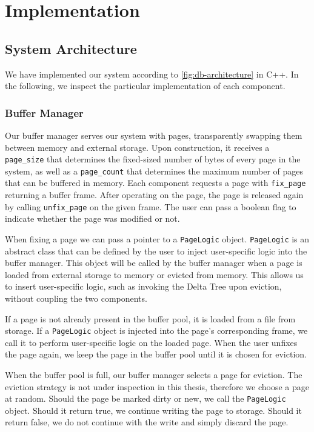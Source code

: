 \chapter{Implementation}
\label{chap:implementation}

\section{System Architecture}
We have implemented our system according to \autoref{fig:db-architecture} in C++. 
In the following, we inspect the particular implementation of each component.

\subsection*{Buffer Manager}
Our buffer manager serves our system with pages, transparently swapping them between memory and external storage.
Upon construction, it receives a \texttt{page\_size} that determines the fixed-sized number of bytes of every page in the system, as well as a \texttt{page\_count} that determines the maximum number of pages that can be buffered in memory.
Each component requests a page with \texttt{fix\_page} returning a buffer frame. 
After operating on the page, the page is released again by calling \texttt{unfix\_page} on the given frame.
The user can pass a boolean flag to indicate whether the page was modified or not.

When fixing a page we can pass a pointer to a \texttt{PageLogic} object.
\texttt{PageLogic} is an abstract class that can be defined by the user to inject user-specific logic into the buffer manager.
This object will be called by the buffer manager when a page is loaded from external storage to memory or evicted from memory.
This allows us to insert user-specific logic, such as invoking the Delta Tree upon eviction, without coupling the two components.

If a page is not already present in the buffer pool, it is loaded from a file from storage. 
If a \texttt{PageLogic} object is injected into the page's corresponding frame, we call it to perform user-specific logic on the loaded page.
When the user unfixes the page again, we keep the page in the buffer pool until it is chosen for eviction.

When the buffer pool is full, our buffer manager selects a page for eviction. 
The eviction strategy is not under inspection in this thesis, therefore we choose a page at random.
Should the page be marked dirty or new, we call the \texttt{PageLogic} object.
Should it return true, we continue writing the page to storage.
Should it return false, we do not continue with the write and simply discard the page.

